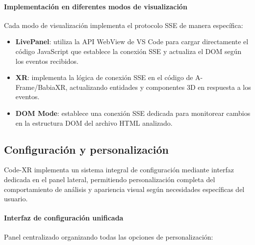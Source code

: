 \documentclass[a4paper, 12pt]{book}
\begin{document}
\paragraph{Implementación en diferentes modos de visualización}
Cada modo de visualización implementa el protocolo SSE de manera específica:

\begin{itemize}
  \item \textbf{LivePanel}: utiliza la API WebView de VS Code para cargar directamente el código JavaScript que establece la conexión SSE y actualiza el DOM según los eventos recibidos.
  
  \item \textbf{XR}: implementa la lógica de conexión SSE en el código de A-Frame/BabiaXR, actualizando entidades y componentes 3D en respuesta a los eventos.
  
  \item \textbf{DOM Mode}: establece una conexión SSE dedicada para monitorear cambios en la estructura DOM del archivo HTML analizado.
\end{itemize}

\subsection{Configuración y personalización}
\label{sec:configuracion}

Code-XR implementa un sistema integral de configuración mediante interfaz dedicada en el panel lateral, permitiendo personalización completa del comportamiento de análisis y apariencia visual según necesidades específicas del usuario.

\paragraph{Interfaz de configuración unificada}
Panel centralizado organizando todas las opciones de personalización:
\end{document}
